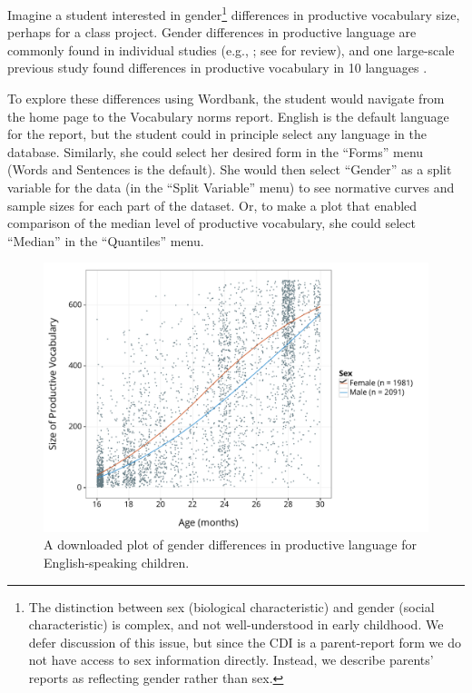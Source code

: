 \documentclass[man,noapacite]{apa}
\begin{document}
Imagine a student interested in gender\footnote{The distinction between sex (biological characteristic) and gender (social characteristic) is complex, and not well-understood in early childhood. We defer discussion of this issue, but since the CDI is a parent-report form we do not have access to sex information directly. Instead, we describe parents' reports as reflecting gender rather than sex.} differences in productive vocabulary size, perhaps for a class project. Gender differences in productive language are commonly found in individual studies (e.g., ; see  for review), and one large-scale previous study found differences in productive vocabulary in 10 languages \cite{eriksson2012}. 

To explore these differences using Wordbank, the student would navigate from the home page to the Vocabulary norms report. English is the default language for the report, but the student could in principle select any language in the database. Similarly, she could select her desired form in the ``Forms'' menu (Words and Sentences is the default). She would then select ``Gender'' as a split variable for the data (in the ``Split Variable'' menu) to see normative curves and sample sizes for each part of the dataset. Or, to make a plot that enabled comparison of the median level of productive vocabulary, she could select ``Median'' in the ``Quantiles'' menu. 

\begin{figure}[h!]
\includegraphics[width=6in]{figures/vocabulary_norms.pdf}
\caption{\label{fig:gender1} A downloaded plot of gender differences in productive language for English-speaking children.}
\end{figure}
\end{document}
